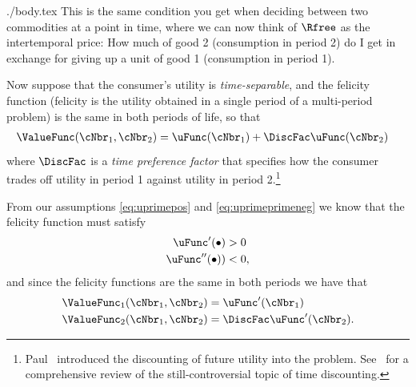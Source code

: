 \documentclass{handout}
\begin{document}
\begin{verbatimwrite}{./body.tex}
  This is the same condition you get when deciding between two commodities at a point in time, where we can now think of $\Rfree$ as the intertemporal price: How much of good 2 (consumption in period 2) do I get in exchange for giving up a unit of good 1 (consumption in period 1).

  Now suppose that the consumer's utility is \textit{time-separable}, 
  and the felicity function (felicity is the utility obtained in a
  single period of a multi-period problem) is the same in both periods
  of life, so that
  \begin{equation}\begin{gathered}\begin{aligned}
        \ValueFunc(\cNbr_{1},\cNbr_{2}) & =  \uFunc(\cNbr_{1})+\DiscFac \uFunc(\cNbr_{2})
      \end{aligned}\end{gathered}\end{equation}
  where $\DiscFac$ is a \textit{time preference factor} that specifies how
  the consumer trades off utility in period 1 against utility in period
  2.\footnote{Paul~\cite{samuelson1937note,samuelsonOLG} introduced the 
    discounting of future utility into the problem.  See~\cite{floDiscounting} for 
    a comprehensive review of the still-controversial topic of time discounting.}

  From our assumptions \eqref{eq:uprimepos} and \eqref{eq:uprimeprimeneg}
  we know that the felicity function must satisfy
  \begin{equation}\begin{gathered}\begin{aligned}
        \uFunc^{\prime}(\bullet) & >  0  \\
        \uFunc^{\prime\prime}(\bullet)) & <  0,
      \end{aligned}\end{gathered}\end{equation}
  and since the felicity functions are the same in both periods we have
  that
  \begin{equation}\begin{gathered}\begin{aligned}
        \ValueFunc_{1}(\cNbr_{1},\cNbr_{2}) & =  \uFunc^{\prime}(\cNbr_{1})
        \\ \ValueFunc_{2}(\cNbr_{1},\cNbr_{2}) & =  \DiscFac \uFunc^{\prime}(\cNbr_{2}).
      \end{aligned}\end{gathered}\end{equation}


\end{verbatimwrite}
\end{document}
